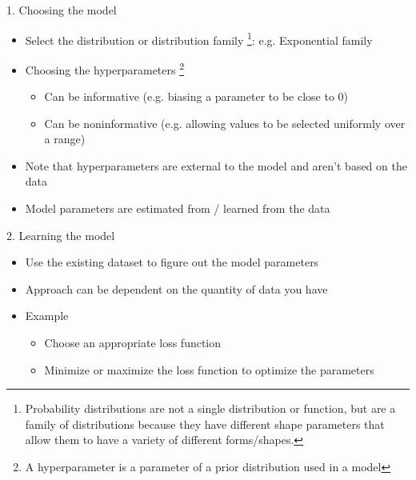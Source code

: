 \documentclass[aspectratio=169]{beamer}
\begin{document}
\begin{frame}{1. Choosing the model}

\begin{itemize}
\item Select the distribution or distribution family \footnote{Probability distributions are not a single distribution or function, but are a family of distributions because they have different shape parameters that allow them to have a variety of different forms/shapes.}: e.g. Exponential family
\item Choosing the hyperparameters \footnote{A hyperparameter is a parameter of a prior distribution used in a model
}
\begin{itemize}
\item Can be informative (e.g. biasing a parameter to be close to 0)
\item Can be noninformative (e.g. allowing values to be selected uniformly over a range)
\end{itemize}
\item Note that hyperparameters are external to the model and aren't based on the data
\item Model parameters are estimated from / learned from the data
\end{itemize}
\end{frame}
\begin{frame}{2. Learning the model}

\begin{itemize}
\item Use the existing dataset to figure out the model parameters
\item Approach can be dependent on the quantity of data you have
\item Example 
\begin{itemize}
\item Choose an appropriate loss function 
\item Minimize or maximize the loss function to optimize the parameters
\end{itemize}
\end{itemize}
\end{frame}
\end{document}
